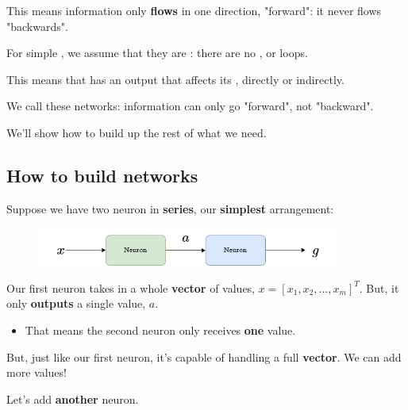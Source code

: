         This means information only \textbf{flows} in one direction, "forward": it never flows "backwards".\\
        
        \begin{concept}
            For simple , we assume that they are : there are no , or loops.
            
            This means that  has an output that affects its , directly or indirectly.
            
            We call these  networks: information can only go "forward", not "backward".
        \end{concept}
        
        We'll show how to build up the rest of what we need.
    
    \subsection{How to build networks}
        
        Suppose we have two neuron in \textbf{series}, our \textbf{simplest} arrangement:
        
        \begin{figure}[H]
            \centering
            \includegraphics[width=100mm,scale=0.4]{images/nn_images/series_a.png}
        \end{figure}
        
        Our first neuron takes in a whole \textbf{vector} of values, $x = [x_1, x_2, ..., x_m]^T$. But, it only \textbf{outputs} a single value, $a$.

        \begin{itemize}
            \item That means the second neuron only receives \textbf{one} value.
        \end{itemize}
        
        
        But, just like our first neuron, it's capable of handling a full \textbf{vector}. We can add more values!
        
        Let's add \textbf{another} neuron.
        
